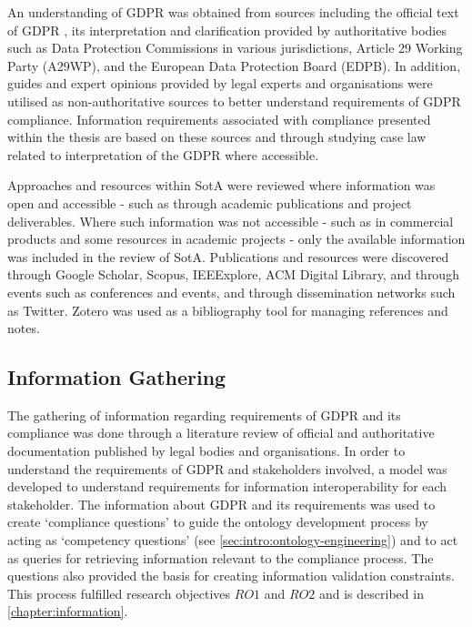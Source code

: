 An understanding of GDPR was obtained from sources including the official text of GDPR \cite{Regulation_GDPR}, its interpretation and clarification provided by authoritative bodies such as Data Protection Commissions in various jurisdictions, Article 29 Working Party (A29WP), and the European Data Protection Board (EDPB).
In addition, guides and expert opinions provided by legal experts and organisations were utilised as non-authoritative sources to better understand requirements of GDPR compliance.
Information requirements associated with compliance presented within the thesis are based on these sources and through studying case law related to interpretation of the GDPR where accessible.

Approaches and resources within SotA were reviewed where information was open and accessible - such as through academic publications and project deliverables.
Where such information was not accessible - such as in commercial products and some resources in academic projects - only the available information was included in the review of SotA.
Publications and resources were discovered through Google Scholar, Scopus, IEEExplore, ACM Digital Library, and through events such as conferences and events, and through dissemination networks such as Twitter.
Zotero was used as a bibliography tool for managing references and notes.

\subsection{Information Gathering}
The gathering of information regarding requirements of GDPR and its compliance was done through a literature review of official and authoritative documentation published by legal bodies and organisations.
In order to understand the requirements of GDPR and stakeholders involved, a model was developed to understand requirements for information interoperability for each stakeholder.
The information about GDPR and its requirements was used to create `compliance questions' to guide the ontology development process by acting as `competency questions' (see \autoref{sec:intro:ontology-engineering}) and to act as queries for retrieving information relevant to the compliance process. The questions also provided the basis for creating information validation constraints.
This process fulfilled research objectives $RO1$ and $RO2$ and is described in \autoref{chapter:information}.

